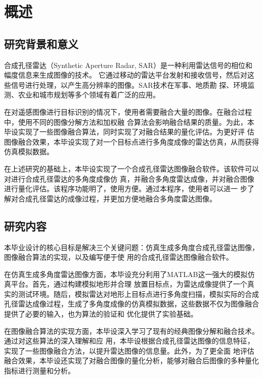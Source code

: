 \documentclass{xduugthesis}
\begin{document}
\chapter{概述}
\section{研究背景和意义}
合成孔径雷达（Synthetic Aperture Radar, SAR）是一种利用雷达信号的相位和幅度信息来生成图像的技术。
它通过移动的雷达平台发射和接收信号，然后对这些信号进行处理，以产生高分辨率的图像。SAR技术在军事、地质勘
探、环境监测、农业和城市规划等多个领域有着广泛的应用。\par
在对遥感图像进行目标识别的情况下，使用者需要融合大量的图像。在融合过程中，使用不同的图像分解方法和加权融
合算法会影响融合结果的质量。为此，本毕设实现了一些图像融合算法，同时实现了对融合结果的量化评估。为更好评
估图像融合效果，本毕设实现了对一个目标点进行多角度成像的雷达仿真，从而获得仿真模拟数据。\par
在上述研究的基础上，本毕设实现了一个合成孔径雷达图像融合软件。该软件可以对进行合成孔径雷达的多角度成像仿
真，并融合多角度雷达成像，并对融合图像进行量化评估。该程序功能明了，使用方便。通过本程序，使用者可以进一
步了解对合成孔径雷达的成像过程，并更加方便地融合多角度雷达图像。\par
\section{研究内容}
本毕业设计的核心目标是解决三个关键问题：仿真生成多角度合成孔径雷达图像，图像融合算法的实现，以及编写便于使
用的合成孔径雷达图像融合软件。\par

在仿真生成多角度雷达图像方面，本毕设充分利用了MATLAB这一强大的模拟仿真平台。首先，通过构建模拟地形并合理
放置目标点，为雷达成像提供了一个真实的测试环境。随后，模拟雷达对地形上目标点进行多角度扫描，模拟实际的合成
孔径雷达成像过程，生成了多角度成像的仿真模拟数据，这些数据不仅为图像融合提供了必要的输入，也为算法的验证和
优化提供了实验基础。\par

在图像融合算法的实现方面，本毕设深入学习了现有的经典图像分解和融合技术。通过对这些算法的深入理解和应
用，本毕设根据合成孔径雷达图像的信息特征，实现了一些图像融合方法，以提升雷达图像的信息量。此外，为了更全面
地评估融合效果，本毕设还实现了对融合图像的量化分析，能够对融合后图像的多种量化指标进行测量和分析。\par
\end{document}
